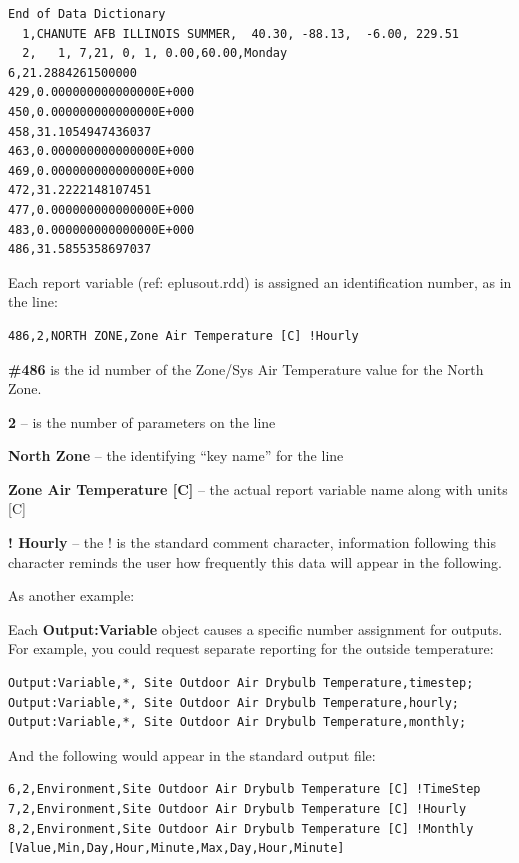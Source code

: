\begin{lstlisting}
End of Data Dictionary
  1,CHANUTE AFB ILLINOIS SUMMER,  40.30, -88.13,  -6.00, 229.51
  2,   1, 7,21, 0, 1, 0.00,60.00,Monday
6,21.2884261500000
429,0.000000000000000E+000
450,0.000000000000000E+000
458,31.1054947436037
463,0.000000000000000E+000
469,0.000000000000000E+000
472,31.2222148107451
477,0.000000000000000E+000
483,0.000000000000000E+000
486,31.5855358697037
\end{lstlisting}

Each report variable (ref: eplusout.rdd) is assigned an identification number, as in the line:

\begin{lstlisting}
486,2,NORTH ZONE,Zone Air Temperature [C] !Hourly
\end{lstlisting}

\textbf{\#486} is the id number of the Zone/Sys Air Temperature value for the North Zone.

\textbf{2} – is the number of parameters on the line

\textbf{North Zone} – the identifying “key name” for the line

\textbf{Zone Air Temperature [C]} – the actual report variable name along with units [C]

\textbf{! Hourly} – the ! is the standard comment character, information following this character reminds the user how frequently this data will appear in the following.

As another example:

Each \textbf{Output:Variable} object causes a specific number assignment for outputs. For example, you could request separate reporting for the outside temperature:

\begin{lstlisting}
Output:Variable,*, Site Outdoor Air Drybulb Temperature,timestep;
Output:Variable,*, Site Outdoor Air Drybulb Temperature,hourly;
Output:Variable,*, Site Outdoor Air Drybulb Temperature,monthly;
\end{lstlisting}

And the following would appear in the standard output file:

\begin{lstlisting}
6,2,Environment,Site Outdoor Air Drybulb Temperature [C] !TimeStep
7,2,Environment,Site Outdoor Air Drybulb Temperature [C] !Hourly
8,2,Environment,Site Outdoor Air Drybulb Temperature [C] !Monthly [Value,Min,Day,Hour,Minute,Max,Day,Hour,Minute]
\end{lstlisting}

